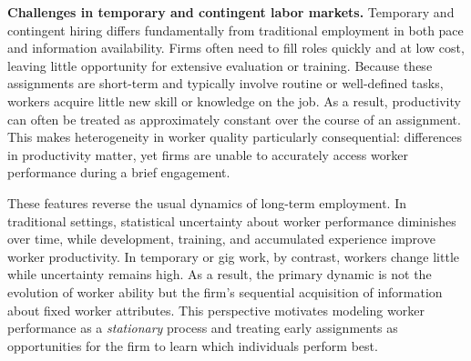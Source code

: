 \documentclass[opre,blindrev]{informs3}
\begin{document}
{\bf Challenges in temporary and contingent labor markets.}
Temporary and contingent hiring differs fundamentally from traditional employment in both pace and information availability. Firms often need to fill roles quickly and at low cost, leaving little opportunity for extensive evaluation or training. Because these assignments are short-term and typically involve routine or well-defined tasks, workers acquire little new skill or knowledge on the job. As a result, productivity can often be treated as approximately constant over the course of an assignment. This makes heterogeneity in worker quality particularly consequential: differences in productivity matter, yet firms are unable to accurately access 
worker performance during a brief engagement.

These features reverse the usual dynamics of long-term employment. In traditional settings, statistical uncertainty about worker performance diminishes over time, while development, training, and accumulated experience improve worker productivity. In temporary or gig work, by contrast, workers change little while uncertainty remains high. As a result, the primary dynamic is not the evolution of worker ability but the firm's sequential acquisition of information about fixed worker attributes. This perspective motivates modeling worker performance as a \emph{stationary} process and treating early assignments as opportunities for the firm to learn which individuals perform best.

\end{document}
